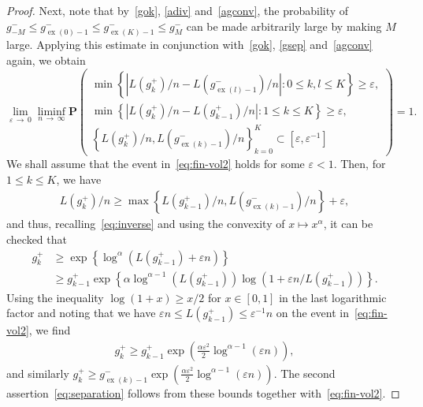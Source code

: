 \documentclass[10pt]{amsart}
\theoremstyle{definition}\newtheorem{defi}[theo]{Definition}\newtheorem{rema}[theo]{Remark}\newtheorem{exam}[theo]{Example}\newtheorem{exem}[theo]{Example}\newtheorem{nota}[theo]{Notation}
\newcommand{\bfP}{\mathbf{P}}
\renewcommand{\epsilon}{\varepsilon}
\newcommand\ex{\operatorname{ex}}
\newcommand{\gtt}[1]{g_{\ex(#1)-1}^-}
\begin{document}
\begin{proof}
Next, note that by~\eqref{gok}, \eqref{adiv} and~\eqref{agconv}, the probability of $g_{-M}^-\leq \gtt{0} \leq \gtt{K}\leq g_M^-$ can be made arbitrarily large by making $M$ large. Applying this estimate in conjunction with~\eqref{gok}, \eqref{gsep} and~\eqref{agconv} again, we obtain
\begin{equation}\label{eq:fin-vol2}
\lim_{\epsilon\,\to\,0}\liminf_{n\,\to\,\infty} \bfP
\begin{pmatrix}
\min\left\{\left|L\left(g_k^+\right)/n-L(\gtt{l})/n\right|\colon 0\le k,l \le K\right\}\ge \epsilon,\\
\min\left\{\left|L\left(g_k^+\right)/n-L\left(g^+_{k-1}\right)/n\right|\colon 1\le k \le K\right\}\ge \epsilon,\\
\left\{L\left(g_k^+\right)/n, L(\gtt{k})/n\right\}_{k=0}^K \subset \left[\epsilon,\epsilon^{-1}\right]
\end{pmatrix} =1.
\end{equation}
We shall assume that the event in~\eqref{eq:fin-vol2} holds for some $\epsilon <1$. Then, for $1\leq k\leq K$, we have
\begin{align*}
L\left(g_k^+\right)/n \ge \max\left\{L\left(g_{k-1}^+\right)/n, L(\gtt{k})/n\right\} +\epsilon,
\end{align*}
and thus, recalling~\eqref{eq:inverse} and using the convexity of $x\mapsto x^\alpha$, it can be checked that
\begin{align*}
g_k^+& \ge \exp\left\{\log^\alpha \left(L\left(g_{k-1}^+\right)+\epsilon n\right)\right\}\\
&\ge g_{k-1}^+ \exp\left\{\alpha \log^{\alpha-1} \left(L\left(g_{k-1}^+\right)\right) \log\left(1+\epsilon n/L\left(g_{k-1}^+\right)\right)\right\}.
\end{align*}
Using the inequality $\log (1+x) \ge x/2$ for $x\in[0,1]$ in the last logarithmic factor and noting that we have $\epsilon n \le L(g_{k-1}^+)\le \epsilon^{-1}n$ on the event in~\eqref{eq:fin-vol2}, we find
\begin{align*}
g_k^+\ge g_{k-1}^+\exp\left(\tfrac{\alpha \epsilon^2}{2} \log^{\alpha-1} (\varepsilon n)\right),
\end{align*}
and similarly $g_k^+\ge \gtt{k}\exp(\tfrac{\alpha \epsilon^2}{2} \log^{\alpha-1}(\varepsilon n))$. The second assertion~\eqref{eq:separation} follows from these bounds together with~\eqref{eq:fin-vol2}.


\end{proof}
\end{document}
